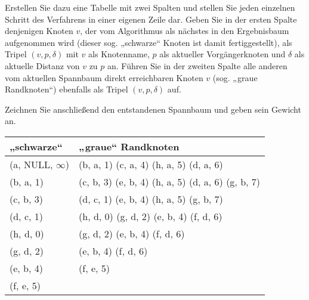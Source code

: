 \documentclass{bschlangaul-aufgabe}
\begin{document}
\begin{enumerate}
\begin{center}
\end{center}

Erstellen Sie dazu eine Tabelle mit zwei Spalten und stellen Sie jeden
einzelnen Schritt des Verfahrens in einer eigenen Zeile dar. Geben Sie
in der ersten Spalte denjenigen Knoten $v$, der vom Algorithmus als
nächstes in den Ergebnisbaum aufgenommen wird (dieser sog.
„schwarze“ Knoten ist damit fertiggestellt), als Tripel $(v, p, \delta)$
mit $v$ als Knotenname, $p$ als aktueller Vorgängerknoten und $\delta$
als aktuelle Distanz von $v$ zu $p$ an. Führen Sie in der zweiten Spalte
alle anderen vom aktuellen Spannbaum direkt erreichbaren Knoten $v$
(sog. „graue Randknoten“) ebenfalls als Tripel $(v, p, \delta)$ auf.

Zeichnen Sie anschließend den entstandenen Spannbaum und geben sein
Gewicht an.

\begin{bAntwort}

\begin{tabular}{l|l}
„schwarze“ & „graue“ Randknoten \\\hline\hline
(a, NULL, $\infty$) & (b, a, 1) (c, a, 4)  (h, a, 5) (d, a, 6) \\\hline
(b, a, 1) & (c, b, 3) (e, b, 4) (h, a, 5) (d, a, 6) (g, b, 7) \\\hline
(c, b, 3) & (d, c, 1) (e, b, 4) (h, a, 5) (g, b, 7) \\\hline
(d, c, 1) & (h, d, 0) (g, d, 2) (e, b, 4) (f, d, 6)\\\hline
(h, d, 0) & (g, d, 2) (e, b, 4) (f, d, 6) \\\hline
(g, d, 2) & (e, b, 4) (f, d, 6) \\\hline
(e, b, 4) & (f, e, 5) \\\hline
(f, e, 5) & \\\hline
\end{tabular}

\begin{center}
\end{center}
\end{bAntwort}
\end{enumerate}
\end{document}
